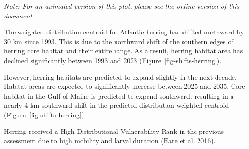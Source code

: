 \documentclass[
  letterpaper,
  DIV=11,
  numbers=noendperiod]{scrartcl}
\begin{document}
\emph{Note: For an animated version of this plot, please see the online
version of this document.}

The weighted distribution centroid for Atlantic herring has shifted
northward by 30 km since 1993. This is due to the northward shift of the
southern edges of herring core habitat and their entire range. As a
result, herring habitat area has declined significantly between 1993 and
2023 (Figure~\ref{fig-shifts-herring}).

However, herring habitats are predicted to expand slightly in the next
decade. Habitat areas are expected to significantly increase between
2025 and 2035. Core habitat in the Gulf of Maine is predicted to expand
southward, resulting in a nearly 4 km southward shift in the predicted
distribution weighted centroid (Figure~\ref{fig-shifts-herring}).

Herring received a High Distributional Vulnerability Rank in the
previous assessment due to high mobility and larval duration (Hare et
al. 2016).
\end{document}
